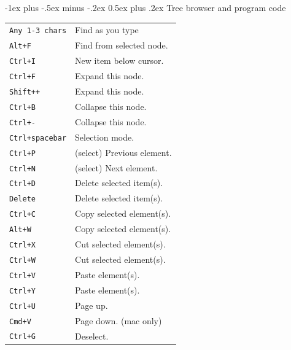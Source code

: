 \documentclass[10pt,landscape]{article}
\makeatletter
\renewcommand{\section}{\@startsection{section}{1}{0mm}%
                                {-1ex plus -.5ex minus -.2ex}%
                                {0.5ex plus .2ex}%
                                {\normalfont\large\bfseries}}
\makeatother
\begin{document}
\begin{multicols}{3}
\section{Tree browser and program code}
\newlength{\MyLen}
\begin{tabular}{@{}ll@{}}
\verb!Any 1-3 chars!    & Find as you type \\
\verb!Alt+F!  & Find from selected node. \\
\verb!Ctrl+I!    & New item below cursor. \\
\verb!Ctrl+F!  & Expand this node. \\
\verb!Shift++!  & Expand this node. \\
\verb!Ctrl+B!  & Collapse this node. \\
\verb!Ctrl+-!  & Collapse this node. \\
\verb!Ctrl+spacebar!  & Selection mode. \\
\verb!Ctrl+P!  & (select) Previous element. \\
\verb!Ctrl+N!  & (select) Next element. \\
\verb!Ctrl+D!  & Delete selected item(s). \\
\verb!Delete!  & Delete selected item(s). \\
\verb!Ctrl+C!  & Copy selected element(s). \\
\verb!Alt+W!  & Copy selected element(s). \\
\verb!Ctrl+X!  & Cut selected element(s). \\
\verb!Ctrl+W!  & Cut selected element(s). \\
\verb!Ctrl+V!  & Paste element(s). \\
\verb!Ctrl+Y!  & Paste element(s). \\
\verb!Ctrl+U!  & Page up. \\
\verb!Cmd+V!  & Page down. (mac only) \\
\verb!Ctrl+G!  & Deselect. \\
\end{tabular}


\end{multicols}
\end{document}
